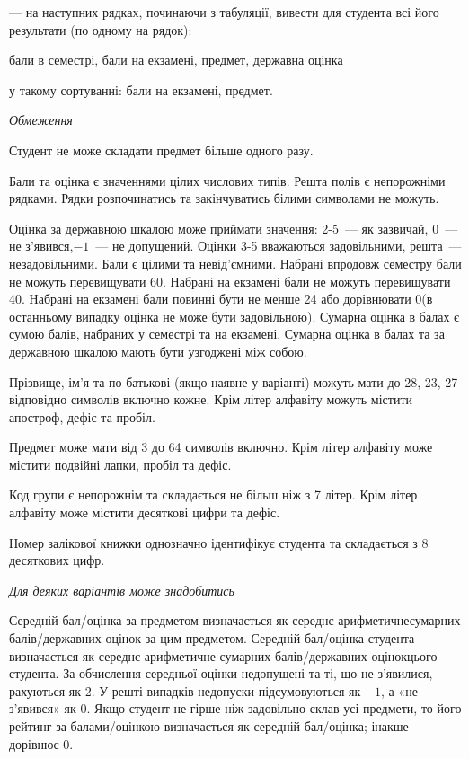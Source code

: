 \documentclass[11pt, ukrainian]{article}
\begin{document}
{\noindent}--- на наступних рядках, починаючи з табуляції, вивести для студента всі його результати (по одному на рядок):\par
бали в семестрі, бали на екзамені, предмет, державна оцінка

{\noindent}у такому сортуванні: бали на екзамені, предмет.


\bigskip\textit{Обмеження}

Студент не може складати предмет більше одного разу.

Бали та оцінка є значеннями цілих числових типів. Решта полів є непорожніми рядками.
Рядки розпочинатись та закінчуватись білими символами не можуть.

Оцінка за державною шкалою може приймати значення: 2-5~--- як зазвичай, 0~--- не з’явився,$-1$~--- не допущений. 
Оцінки 3-5 вважаються задовільними, решта~--- незадовільними. 
Бали є цілими та невід’ємними.
Набрані впродовж семестру бали не можуть перевищувати 60. 
Набрані на екзамені бали не можуть перевищувати 40. 
Набрані на екзамені бали повинні бути не менше 24 або дорівнювати 0(в останньому випадку оцінка не може бути задовільною). 
Сумарна оцінка в балах є сумою балів, набраних у семестрі та на екзамені.
Сумарна оцінка в балах та за державною шкалою мають бути узгоджені між собою.

Прізвище, ім’я та по-батькові (якщо наявне у варіанті) можуть мати до 28, 23, 27 відповідно символів включно кожне. 
Крім літер алфавіту можуть містити апостроф, дефіс та пробіл.

Предмет може мати від 3 до 64 символів включно. 
Крім літер алфавіту може містити подвійні лапки, пробіл та дефіс.

Код групи є непорожнім та складається не більш ніж з 7 літер. 
Крім літер алфавіту може містити десяткові цифри та дефіс.


Номер залікової книжки однозначно ідентифікує студента та складається з 8 десяткових цифр. 

\bigskip\textit{Для деяких варіантів може знадобитись}

Середній бал/оцінка за предметом визначається як середнє арифметичнесумарних балів/державних оцінок за цим предметом. 
Середній бал/оцінка студента визначається як середнє арифметичне сумарних балів/державних оцінокцього студента. 
За обчислення середньої оцінки недопущені та ті, що не з’явилися, рахуються як 2.
У решті випадків недопуски підсумовуються як $-1$, а «не з’явився» як 0.
Якщо студент не гірше ніж задовільно склав усі предмети, 
то його рейтинг за балами/оцінкою визначається як середній бал/оцінка; інакше дорівнює 0.
\end{document}
